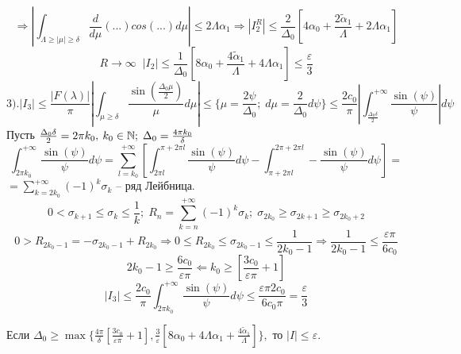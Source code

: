 \[\Rightarrow |\int_{\Lambda \geq |\mu| \geq \delta} \frac{d}{d\mu}(...)cos(...)d\mu| \leq 2\Lambda\alpha_1 \Rightarrow |I_2^R| \leq \frac{2}{\Delta_0}[4\alpha_0 + \frac{2\widetilde{\alpha}_1}{\Lambda} + 2\Lambda\alpha_1]\]
\[R \rightarrow \infty \;\; |I_2| \leq \frac{1}{\Delta_0}[8\alpha_0 + \frac{4\widetilde{\alpha}_1}{\Lambda} + 4\Lambda\alpha_1] \leq \frac{\varepsilon}{3}\]
\[3). |I_3| \leq \frac{|F(\lambda)|}{\pi}|\int_{\mu \geq \delta} \frac{\sin(\frac{\Delta_0\mu}{2})}{\mu}d\mu| \leq \{\mu = \frac{2\psi}{\Delta_0};\;d\mu = \frac{2}{\Delta_0}d\psi\} \leq \frac{2c_0}{\pi}|\int_{\frac{\Delta_0\delta}{2}}^{+\infty} \frac{\sin(\psi)}{\psi}|d\psi\]
Пусть \(\frac{\Delta_0\delta}{2} = 2\pi k_0, \: k_0 \in \mathbb{N};\; \Delta_0 = \frac{4\pi k_0}{\delta}\)
\[\int_{2\pi k_0}^{+\infty} \frac{\sin(\psi)}{\psi}d\psi = \sum_{l = k_0}^{+\infty} [\int_{2\pi l}^{\pi + 2\pi l} \frac{\sin(\psi)}{\psi}d\psi - \int_{\pi + 2\pi l}^{2\pi + 2\pi l} -\frac{\sin(\psi)}{\psi}d\psi] =\]
\(= \sum_{k = 2k_0}^{+\infty} (-1)^k\sigma_k\) -- ряд Лейбница.
\[0 < \sigma_{k + 1} \leq \sigma_k \leq \frac{1}{k};\; R_n = \sum_{k = n}^{+\infty} (-1)^k\sigma_k;\; \sigma_{2k_0} \geq \sigma_{2k + 1} \geq \sigma_{2k_0 + 2}\]
\[0 > R_{2k_0 - 1} = -\sigma_{2k_0 - 1} + R_{2k_0} \Rightarrow 0 \leq R_{2k_0} \leq \sigma_{2k_0 - 1} \leq \frac{1}{2k_0 - 1} \Rightarrow \frac{1}{2k_0 - 1} \leq \frac{\varepsilon\pi}{6c_0}\]
\[2k_0 - 1 \geq \frac{6c_0}{\varepsilon\pi} \Leftarrow k_0 \geq [\frac{3c_0}{\varepsilon\pi} + 1]\]
\[|I_3| \leq \frac{2c_0}{\pi}\int_{2\pi k_0}^{+\infty} \frac{\sin(\psi)}{\psi}d\psi \leq \frac{\varepsilon\pi 2c_0}{6c_0\pi} = \frac{\varepsilon}{3}\]
\begin{theorem}
Если $\Delta_0 \geq \max\{\frac{4\pi}{\delta}[\frac{3c_0}{\varepsilon\pi} + 1], \frac{3}{\varepsilon}[8\alpha_0 + 4\Lambda\alpha_1 + \frac{4\widetilde{\alpha}_1}{\Lambda}]\},$ то $|I| \leq \varepsilon.$
\end{theorem}